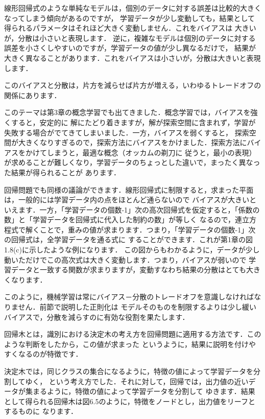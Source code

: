 線形回帰式のような単純なモデルは，個別のデータに対する誤差は比較的大きくなってしまう傾向があるのですが，
学習データが少し変動しても，結果として得られるパラメータはそれほど大きく変動しません．これをバイアスは
大きいが，分散は小さいと表現します．
逆に，複雑なモデルは個別のデータに対する誤差を小さくしやすいのですが，学習データの値が少し異なるだけで，
結果が大きく異なることがあります．これをバイアスは小さいが，分散は大きいと表現します．

このバイアスと分散は，片方を減らせば片方が増える，いわゆるトレードオフの関係にあります．

このテーマは第3章の概念学習でも出てきました．概念学習では，バイアスを強くすると，安定的に
解にたどり着きますが，解が探索空間に含まれず，学習が失敗する場合がでてきてしまいました．一方，バイアスを弱くすると，
探索空間が大きくなりすぎるので，探索方法にバイアスをかけました．探索方法にバイアスをかけてしまうと，最適な概念（オッカムの剃刀に
従うと，最小の表現）が求めることが難しくなり，学習データのちょっとした違いで，まったく異なった結果が得られることが
あります．

回帰問題でも同様の議論ができます．線形回帰式に制限すると，求まった平面は，一般的には学習データ内の点をほとんど通らないので
バイアスが大きいといえます．一方，「学習データの個数-1」次の高次回帰式を仮定すると，「係数の数」と「学習データを回帰式に代入した制約の数」が等しく
なるので，連立方程式で解くことで，重みの値が求まります．つまり，「学習データの個数-1」次の回帰式は，全学習データを通る式に
することができます．これが第1章の図1.8(c)に示したような例になります．
この図からもわかるように，データが少し動いただけでこの高次式は大きく変動します．つまり，バイアスが弱いので
学習データと一致する関数が求まりますが，変動すなわち結果の分散はとても大きくなります．

このように，機械学習は常にバイアス－分散のトレードオフを意識しなければなりません．前節で説明した正則化は
モデルそのものを制限するよりは少し緩いバイアスで，分散を減らすのに有効な役割を果たします．


回帰木とは，識別における決定木の考え方を回帰問題に適用する方法です．このような判断をしたから，この値が求まった
というように，結果に説明を付けやすくなるのが特徴です．

決定木では，同じクラスの集合になるように，特徴の値によって学習データを分割してゆく，
という考え方でした．それに対して，回帰では，出力値の近いデータが集まるように，特徴の値によって学習データを分割して
ゆきます．結果として得られる回帰木は図6.5のように，特徴をノードとし，出力値をリーフとするものに
なります．

